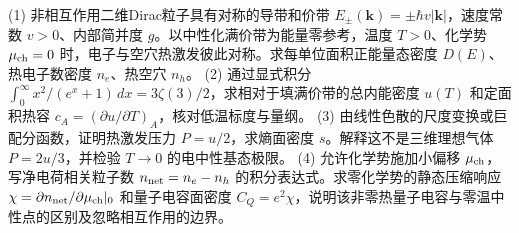 (1) 非相互作用二维Dirac粒子具有对称的导带和价带 \(E_\pm(\boldsymbol k)=\pm\hbar v|\boldsymbol k|\)，速度常数 \(v>0\)、内部简并度 \(g\)。以中性化满价带为能量零参考，温度 \(T>0\)、化学势 \(\mu_{\rm ch}=0\) 时，电子与空穴热激发彼此对称。求每单位面积正能量态密度 \(D(E)\)、热电子数密度 \(n_e\)、热空穴 \(n_h\)。
(2) 通过显式积分 \( \int_0^\infty x^2/(e^x+1)\,dx=3\zeta(3)/2\)，求相对于填满价带的总内能密度 \(u(T)\) 和定面积热容 \(c_A=(\partial u/\partial T)_A\)，核对低温标度与量纲。
(3) 由线性色散的尺度变换或巨配分函数，证明热激发压力 \(P=u/2\)，求熵面密度 \(s\)。解释这不是三维理想气体 \(P=2u/3\)，并检验 \(T\to0\) 的电中性基态极限。
(4) 允许化学势施加小偏移 \(\mu_{\rm ch}\)，写净电荷相关粒子数 \(n_{\rm net}=n_e-n_h\) 的积分表达式。求零化学势的静态压缩响应 \(\chi=\partial n_{\rm net}/\partial\mu_{\rm ch}|_0\) 和量子电容面密度 \(C_Q=e^2\chi\)，说明该非零热量子电容与零温中性点的区别及忽略相互作用的边界。
